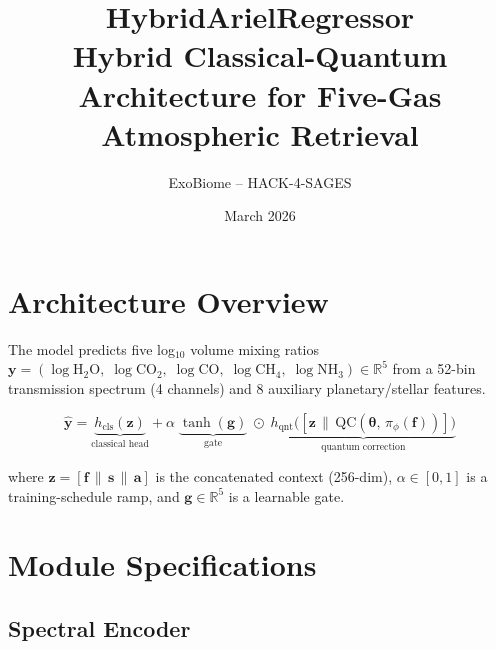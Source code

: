 \documentclass[11pt,a4paper]{article}
\title{\textbf{HybridArielRegressor}\\[4pt]\large Hybrid Classical-Quantum Architecture for Five-Gas Atmospheric Retrieval}
\author{ExoBiome -- HACK-4-SAGES}
\date{March 2026}
\begin{document}
\maketitle

\section{Architecture Overview}

The model predicts five log$_{10}$ volume mixing ratios
$\mathbf{y} = (\log\text{H}_2\text{O},\;\log\text{CO}_2,\;\log\text{CO},\;\log\text{CH}_4,\;\log\text{NH}_3) \in \mathbb{R}^5$
from a 52-bin transmission spectrum (4 channels) and 8 auxiliary planetary/stellar features.

\begin{equation}
\hat{\mathbf{y}} = \underbrace{h_{\mathrm{cls}}(\mathbf{z})}_{\text{classical head}}
+ \alpha\;\underbrace{\tanh(\boldsymbol{g})}_{\text{gate}}
\;\odot\; \underbrace{h_{\mathrm{qnt}}\!\bigl([\mathbf{z}\,\|\,\text{QC}(\boldsymbol{\theta},\,\pi_\phi(\mathbf{f}))]\bigr)}_{\text{quantum correction}}
\end{equation}

where $\mathbf{z}=[\mathbf{f}\,\|\,\mathbf{s}\,\|\,\mathbf{a}]$ is the concatenated context (256-dim),
$\alpha \in [0,1]$ is a training-schedule ramp, and $\boldsymbol{g}\in\mathbb{R}^5$ is a learnable gate.

\section{Module Specifications}

\subsection{Spectral Encoder}
\label{sec:spectral}
\end{document}
